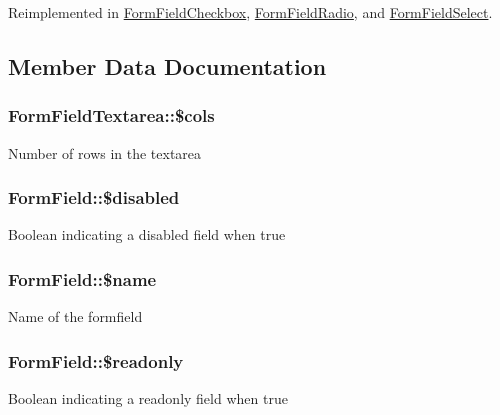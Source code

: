 Reimplemented in \hyperlink{classFormFieldCheckbox_a787abee157599c389a18e0810f69fed5}{FormFieldCheckbox}, \hyperlink{classFormFieldRadio_aab105e92866fd80890d3254f51a2e4ca}{FormFieldRadio}, and \hyperlink{classFormFieldSelect_ae69f5b352df63796c048dca6a2de7544}{FormFieldSelect}.



\subsection{Member Data Documentation}
\subsubsection[{\$cols}]{\setlength{\rightskip}{0pt plus 5cm}FormFieldTextarea::\$cols}\label{classFormFieldTextarea_a70b12469646211ddd78d187269604fd4}
Number of rows in the textarea 
\subsubsection[{\$disabled}]{\setlength{\rightskip}{0pt plus 5cm}FormField::\$disabled}\label{classFormField_ab6f1907061890290e32cb2befc0a5f50}
Boolean indicating a disabled field when true 
\subsubsection[{\$name}]{\setlength{\rightskip}{0pt plus 5cm}FormField::\$name}\label{classFormField_a23861f707bcd77bbace6300de9621746}
Name of the formfield 
\subsubsection[{\$readonly}]{\setlength{\rightskip}{0pt plus 5cm}FormField::\$readonly}\label{classFormField_a78ba5d4b9127e75e8ccf86f397b5d9ac}
Boolean indicating a readonly field when true 
